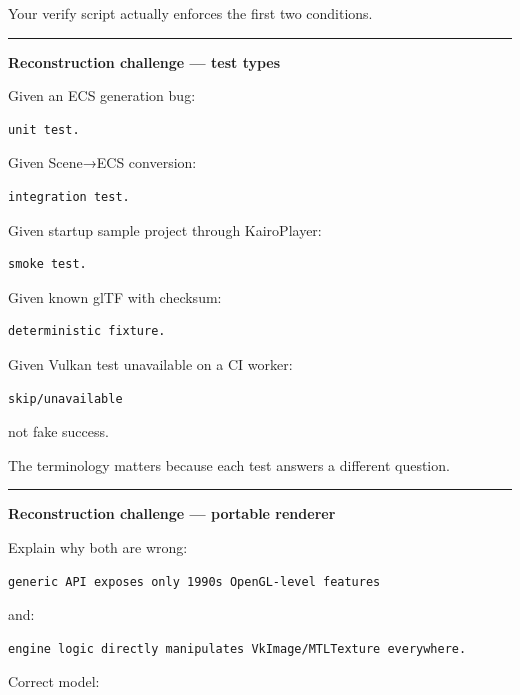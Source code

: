 Your verify script actually enforces the first two conditions.

\begin{center}\rule{0.5\linewidth}{0.5pt}\end{center}

\textbf{Reconstruction challenge --- test types}

Given an ECS generation bug:

\begin{verbatim}
unit test.
\end{verbatim}

Given Scene→ECS conversion:

\begin{verbatim}
integration test.
\end{verbatim}

Given startup sample project through KairoPlayer:

\begin{verbatim}
smoke test.
\end{verbatim}

Given known glTF with checksum:

\begin{verbatim}
deterministic fixture.
\end{verbatim}

Given Vulkan test unavailable on a CI worker:

\begin{verbatim}
skip/unavailable
\end{verbatim}

not fake success.

The terminology matters because each test answers a different question.

\begin{center}\rule{0.5\linewidth}{0.5pt}\end{center}

\textbf{Reconstruction challenge --- portable renderer}

Explain why both are wrong:

\begin{verbatim}
generic API exposes only 1990s OpenGL-level features
\end{verbatim}

and:

\begin{verbatim}
engine logic directly manipulates VkImage/MTLTexture everywhere.
\end{verbatim}

Correct model:

